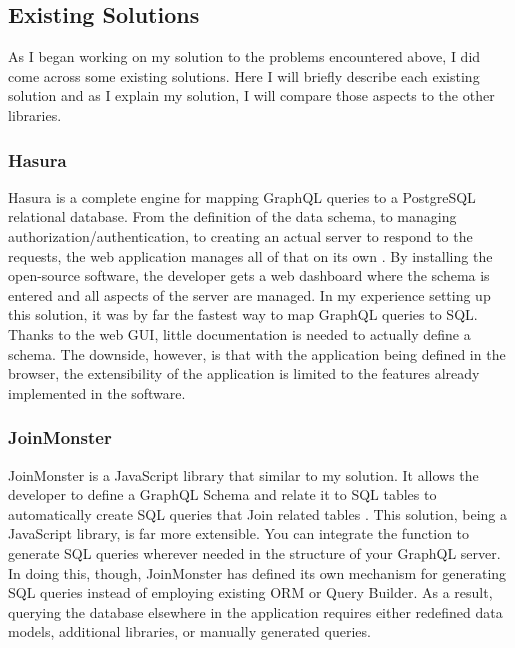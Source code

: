 \subsection{Existing Solutions}

As I began working on my solution to the problems encountered above, I did come across some existing solutions.  Here I will briefly describe each existing solution and as I explain my solution, I will compare those aspects to the other libraries.

\subsubsection{Hasura}

Hasura is a complete engine for mapping GraphQL queries to a PostgreSQL relational database. From the definition of the data schema, to managing authorization/authentication, to creating an actual server to respond to the requests, the web application manages all of that on its own \cite{hasurainc.HasuraGraphQLEngine}.  By installing the open-source software, the developer gets a web dashboard where the schema is entered and all aspects of the server are managed.  In my experience setting up this solution, it was by far the fastest way to map GraphQL queries to SQL.  Thanks to the web GUI, little documentation is needed to actually define a schema.  The downside, however, is that with the application being defined in the browser, the extensibility of the application is limited to the features already implemented in the software.

\subsubsection{JoinMonster}

JoinMonster is a JavaScript library that similar to my solution. It allows the developer to define a GraphQL Schema and relate it to SQL tables to automatically create SQL queries that Join related tables \cite{carlJoinMonster}.  This solution, being a JavaScript library, is far more extensible.  You can integrate the function to generate SQL queries wherever needed in the structure of your GraphQL server.  In doing this, though, JoinMonster has defined its own mechanism for generating SQL queries instead of employing existing ORM or Query Builder.  As a result, querying the database elsewhere in the application requires either redefined data models, additional libraries, or manually generated queries.